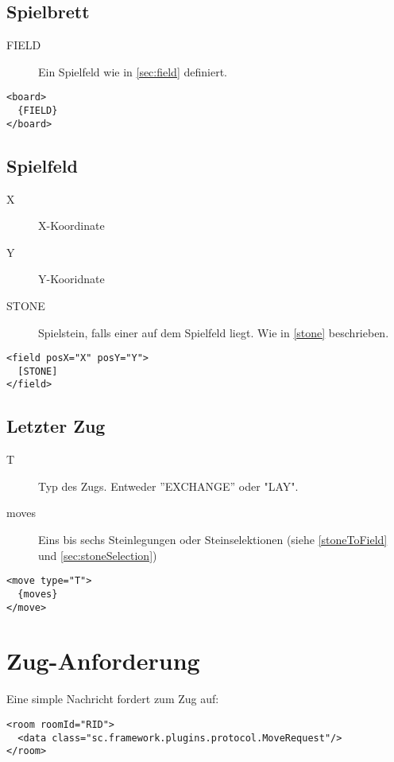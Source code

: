 \documentclass[12pt,a4paper, ngerman, oneside]{scrartcl}
\begin{document}
\subsection{\label{board}Spielbrett}
\begin{description}
\item[FIELD] Ein Spielfeld wie in \ref{sec:field} definiert.
\end{description}
\begin{verbatim}
<board>
  {FIELD}
</board>
\end{verbatim}

\subsection{\label{sec:field}Spielfeld}
\begin{description}
\item[X] X-Koordinate
\item[Y] Y-Kooridnate
\item[STONE] Spielstein, falls einer auf dem Spielfeld liegt. Wie in \ref{stone} beschrieben.
\end{description}
\begin{verbatim}
<field posX="X" posY="Y">
  [STONE]
</field>
\end{verbatim}

\subsection{\label{lastmove}Letzter Zug}
\begin{description}
\item[T] Typ des Zugs. Entweder ''EXCHANGE'' oder "LAY".
\item[moves] Eins bis sechs Steinlegungen oder Steinselektionen (siehe \ref{stoneToField} und \ref{sec:stoneSelection})
\end{description}
\begin{verbatim}
<move type="T">
  {moves}
</move>
\end{verbatim}

\section{\label{moverequest}Zug-Anforderung}
Eine simple Nachricht fordert zum Zug auf:
\begin{verbatim}
<room roomId="RID">
  <data class="sc.framework.plugins.protocol.MoveRequest"/>
</room>
\end{verbatim}
\end{document}
